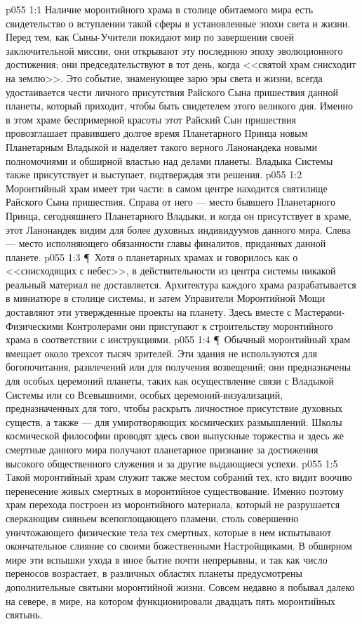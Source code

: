 \vs p055 1:1 Наличие моронтийного храма в столице обитаемого мира есть свидетельство о вступлении такой сферы в установленные эпохи света и жизни. Перед тем, как Сыны\hyp{}Учители покидают мир по завершении своей заключительной миссии, они открывают эту последнюю эпоху эволюционного достижения; они председательствуют в тот день, когда <<святой храм снисходит на землю>>. Это событие, знаменующее зарю эры света и жизни, всегда удостаивается чести личного присутствия Райского Сына пришествия данной планеты, который приходит, чтобы быть свидетелем этого великого дня. Именно в этом храме беспримерной красоты этот Райский Сын пришествия провозглашает правившего долгое время Планетарного Принца новым Планетарным Владыкой и наделяет такого верного Ланонандека новыми полномочиями и обширной властью над делами планеты. Владыка Системы также присутствует и выступает, подтверждая эти решения.
\vs p055 1:2 Моронтийный храм имеет три части: в самом центре находится святилище Райского Сына пришествия. Справа от него --- место бывшего Планетарного Принца, сегодняшнего Планетарного Владыки, и когда он присутствует в храме, этот Ланонандек видим для более духовных индивидуумов данного мира. Слева --- место исполняющего обязанности главы финалитов, приданных данной планете.
\vs p055 1:3 \P\ Хотя о планетарных храмах и говорилось как о <<снисходящих с небес>>, в действительности из центра системы никакой реальный материал не доставляется. Архитектура каждого храма разрабатывается в миниатюре в столице системы, и затем Управители Моронтийной Мощи доставляют эти утвержденные проекты на планету. Здесь вместе с Мастерами\hyp{}Физическими Контролерами они приступают к строительству моронтийного храма в соответствии с инструкциями.
\vs p055 1:4 \P\ Обычный моронтийный храм вмещает около трехсот тысяч зрителей. Эти здания не используются для богопочитания, развлечений или для получения возвещений; они предназначены для особых церемоний планеты, таких как осуществление связи с Владыкой Системы или со Всевышними, особых церемоний\hyp{}визуализаций, предназначенных для того, чтобы раскрыть личностное присутствие духовных существ, а также --- для умиротворяющих космических размышлений. Школы космической философии проводят здесь свои выпускные торжества и здесь же смертные данного мира получают планетарное признание за достижения высокого общественного служения и за другие выдающиеся успехи.
\vs p055 1:5 Такой моронтийный храм служит также местом собраний тех, кто видит воочию перенесение живых смертных в моронтийное существование. Именно поэтому храм перехода построен из моронтийного материала, который не разрушается сверкающим сияньем всепоглощающего пламени, столь совершенно уничтожающего физические тела тех смертных, которые в нем испытывают окончательное слияние со своими божественными Настройщиками. В обширном мире эти вспышки ухода в иное бытие почти непрерывны, и так как число переносов возрастает, в различных областях планеты предусмотрены дополнительные святыни моронтийной жизни. Совсем недавно я побывал далеко на севере, в мире, на котором функционировали двадцать пять моронтийных святынь.
